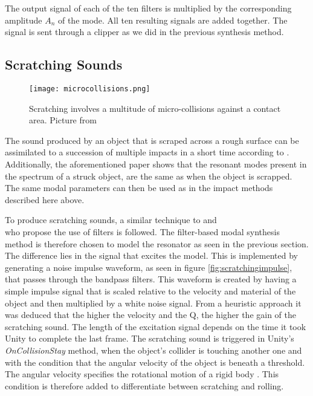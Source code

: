 The output signal of each of the ten filters is multiplied by the corresponding amplitude $A_n$ of the mode. All ten resulting signals are added together. The signal is sent through a clipper as we did in the previous synthesis method.

\subsection{Scratching Sounds}\label{sec:scratching_synth}

\begin{figure}[H]
  \centering
    \texttt{[image: microcollisions.png]}
      \caption{Scratching involves a multitude of micro-collisions against a contact area. Picture from \cite{gaver1993we}}
      \label{fig:microcollisions}
\end{figure}

The sound produced by an object that is scraped across a rough surface can be assimilated to a succession of multiple impacts in a short time according to \cite{gaver1993we}. Additionally, the aforementioned paper shows that the resonant modes present in the spectrum of a struck object, are the same as when the object is scrapped. The same modal parameters can then be used as in the impact methods described here above.

To produce scratching sounds, a similar technique to \cite{gaver1993we} and \\ \cite{van2001foleyautomatic} who propose the use of filters is followed. The filter-based modal synthesis method is therefore chosen to model the resonator as seen in the previous section. The difference lies in the signal that excites the model. This is implemented by generating a noise impulse waveform, as seen in figure \ref{fig:scratchingimpulse}, that passes through the bandpass filters. This waveform is created by having a simple impulse signal that is scaled relative to the velocity and material of the object and then multiplied by a white noise signal. From a heuristic approach it was deduced that the higher the velocity and the \gls{Q}, the higher the gain of the scratching sound. The length of the excitation signal depends on the time it took Unity\textsuperscript{\textregistered} to complete the last frame. The scratching sound is triggered in Unity\textsuperscript{\textregistered}'s \textit{OnCollisionStay} \cite{bib:unity_doc} method, when the object's collider is touching another one and with the condition that the angular velocity of the object is beneath a threshold. The angular velocity specifies the rotational motion of a rigid body \cite{sears1964university}. This condition is therefore added to differentiate between scratching and rolling.

